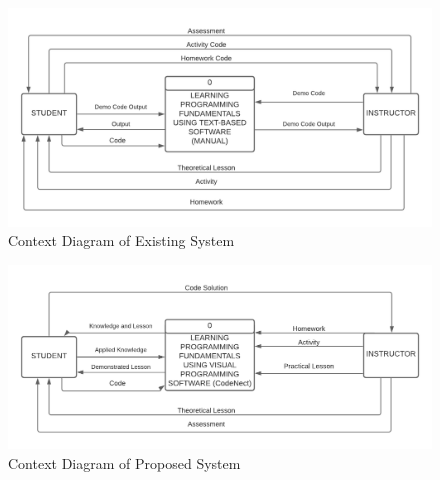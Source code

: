 \begin{doublespace}
\begin{center}
		\clearpage
		\null\vfill
		\begin{figure}[H]
			\centering
			\includegraphics[width=\textwidth]{figures/context_diagram_manual.png}
			\caption{Context Diagram of Existing System}
			\label{fig:context_diagram_manual}
		\end{figure}
		\vfill

		\begin{figure}[H]
			\centering
			\includegraphics[width=\textwidth]{figures/context_diagram.png}
			\caption{Context Diagram of Proposed System}
			\label{fig:context_diagram}
		\end{figure}
		\vfill


\end{center}
\end{doublespace}
